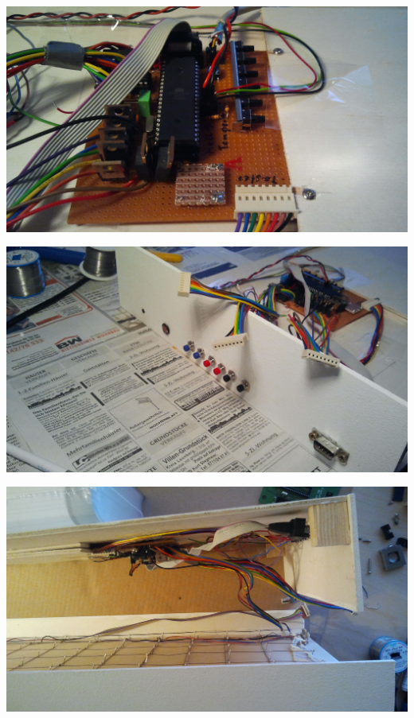 \label{fig_gehaeuse3}
\vfill
\centerline{\includegraphics[width=\linewidth]{images/gehaeuse4.jpg}}
\label{fig_gehaeuse4}
%
\newpage
\centerline{\includegraphics[width=\linewidth]{images/gehaeuse5.jpg}}
\label{fig_gehaeuse5}
\vfill
\centerline{\includegraphics[width=\linewidth]{images/gehaeuse6.jpg}}
\label{fig_gehaeuse6}
